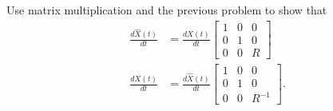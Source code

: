 \documentclass{ximera}
\begin{document}
\begin{problem}
  Use matrix multiplication %
  and the previous problem to show that%
\begin{align*}
\frac{d\hat{X}(t)}{dt}  &  =\frac{dX(t)}{dt}
\begin{bmatrix}
1 & 0 & 0\\
0 & 1 & 0\\
0 & 0 & R
\end{bmatrix} \\
\frac{dX(t)}{dt}  &=\frac{d\hat{X}(t)
}{dt}
\begin{bmatrix}
1 & 0 & 0\\
0 & 1 & 0\\
0 & 0 & R^{-1}%
\end{bmatrix}.
\end{align*}

\end{problem}
\end{document}

